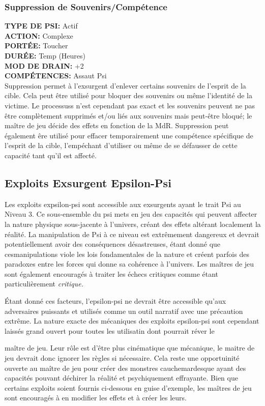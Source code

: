 \subsubsection{Suppression de Souvenirs/Compétence} \textbf{TYPE DE PSI:} Actif \\ \textbf{ACTION:} Complexe \\ \textbf{PORTÉE:} Toucher \\ \textbf{DURÉE:} Temp (Heures) \\ \textbf{MOD DE DRAIN:} +2 \\ \textbf{COMPÉTENCES:} Assaut Psi \\ Suppression permet à l'exsurgent d'enlever certains souvenirs de l'esprit de la cible. Cela peut être utilisé pour bloquer des souvenirs ou même l'identité de la victime. Le processuss n'est cependant pas exact et les souvenirs peuvent ne pas être complètement supprimés et/ou liés aux souvenirs mais peut-être bloqué; le maître de jeu décide des effets en fonction de la MdR. Suppression peut également êre utilisé pour effacer temporairement une compétence spécifique de l'esprit de la cible, l'empéchant d'utiliser ou même de se défausser de cette capacité tant qu'il est affecté. 

\subsection{Exploits Exsurgent Epsilon-Psi} 

Les exploits expsilon-psi sont accessible aux exsurgents ayant le trait Psi au Niveau 3. Ce sous-ensemble du psi mets en jeu des capacités qui peuvent affecter la nature physique sous-jacente à l'univers, créant des effets altérant localement la réalité. La manipulation de Psi à ce niveau est extrêmement dangereux et devrait potentiellement avoir des conséquences désastreuses, étant donné que cesmanipulations viole les lois fondamentales de la nature et créent parfois des paradoxes entre les forces qui donne sa cohérence à l'univers. Les maîtres de jeu sont également encouragés à traiter les échecs critiques comme étant particulièrement \textit{critique.} 

Étant donné ces facteurs, l'epsilon-psi ne devrait être accessible qu'aux adversaires puissants et utilisés comme un outil narratif avec une précaution extrême. La nature exacte des mécaniques des exploits epsilon-psi sont cependant laissés grand ouvert pour toutes les utilisatin dont pourrait réver le 

maître de jeu. Leur rôle est d'être plus cinématique que mécanique, le maitre de jeu devrait donc ignorer les règles si nécessaire. Cela reste une opportuinité ouverte au maître de jeu pour créer des monstres cauchemardesque ayant des capacités pouvant déchirer la réalité et psychiquement effrayante. Bien que certains exploits soient fournis ci-dessous en guise d'exemple, les maîtres de jeu sont encouragés à en modifier les effets et à créer les leurs. 

